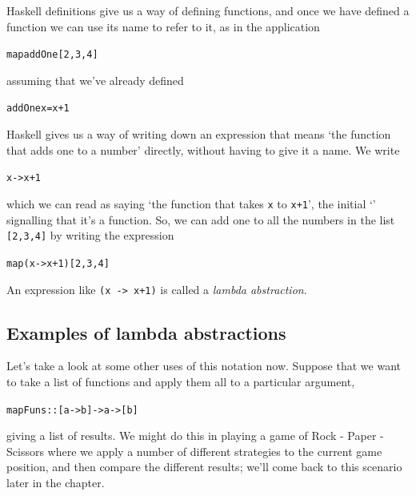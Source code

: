 Haskell definitions give us a way of defining functions, and once we have defined a function we can use its name to refer to it, as in the application
\begin{alltt}
map addOne [2,3,4]
\end{alltt}
assuming that we've already defined
\begin{alltt}
addOne x = x+1
\end{alltt}
Haskell gives us a way of writing down an expression that means `the function that adds one to a number' directly, without having to give it a name. We write
\begin{alltt}
\bs{}x -> x+1
\end{alltt}
which we can read as saying `the function  that takes \texttt{x} to \texttt{x+1}', the initial `\bs{}' signalling that it's a function. So, we can add one to all the numbers in the list \texttt{[2,3,4]} by writing the expression
\begin{alltt}
map (\bs{}x -> x+1) [2,3,4]
\end{alltt}
An expression like \texttt{(\bs{}x -> x+1)} is called a \emph{lambda abstraction}. 


\subsection*{Examples of lambda abstractions}

Let's take a look at some other uses of this notation now. Suppose that we want to take a list of functions and apply them all to a particular argument,
\begin{alltt}
mapFuns :: [a->b] -> a -> [b]
\end{alltt}
giving a list of results. We might do this in playing a game of Rock - Paper - Scissors  where we apply a number of different strategies to the current game position, and then compare the different results; we'll come back to this scenario later in the chapter.


